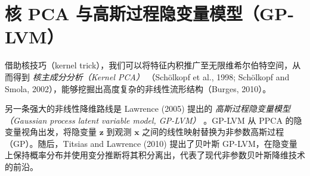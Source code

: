 \section*{核 PCA 与高斯过程隐变量模型（GP-LVM）}

借助核技巧（kernel trick），我们可以将特征内积推广至无限维希尔伯特空间，从而得到 \emph{核主成分分析（Kernel PCA）} （Schölkopf et al., 1998; Schölkopf and Smola, 2002），能够挖掘出高度复杂的非线性流形结构（Burges, 2010）。

另一条强大的非线性降维路线是 Lawrence (2005) 提出的 \emph{高斯过程隐变量模型（Gaussian process latent variable model, GP-LVM）} 。GP-LVM 从 PPCA 的隐变量视角出发，将隐变量 $ \boldsymbol{z} $ 到观测 $ \boldsymbol{x} $ 之间的线性映射替换为非参数高斯过程（GP）。随后，Titsias and Lawrence (2010) 提出了贝叶斯 GP-LVM，在隐变量上保持概率分布并使用变分推断将其积分离出，代表了现代非参数贝叶斯降维技术的前沿。
